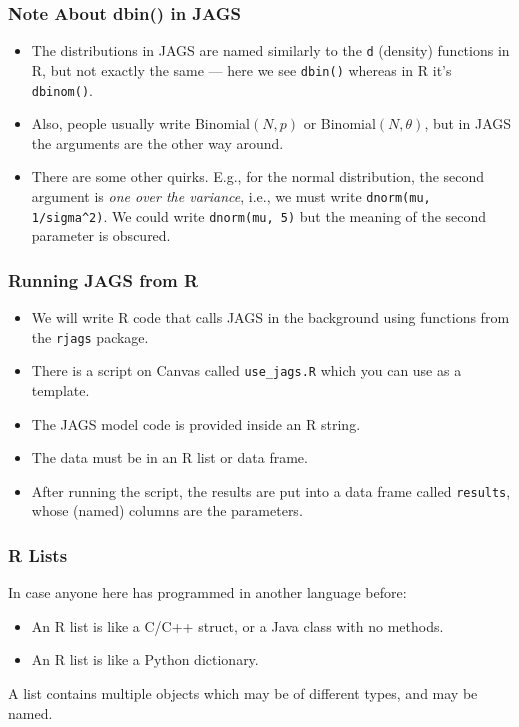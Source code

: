 \documentclass{beamer}
\begin{document}
\begin{frame}[fragile]
\frametitle{Note About dbin() in JAGS}

\begin{itemize}
\item The distributions in JAGS are named similarly to the \texttt{d}
(density) functions in R, but not exactly the same --- here we see
\texttt{dbin()} whereas in R it's \texttt{dbinom()}.\pause
\item Also, people usually write Binomial$(N, p)$ or Binomial$(N, \theta)$,
but in JAGS the arguments are the other way around.\pause
\item There are some other quirks. E.g., for the normal distribution, the
second argument is {\em one over the variance}, i.e., we must write
\texttt{dnorm(mu, 1/sigma^2)}. 
We could write \texttt{dnorm(mu, 5)}
but the meaning of the second parameter is obscured.
\end{itemize}

\end{frame}



\begin{frame}[fragile]
\frametitle{Running JAGS from R}

\begin{itemize}
\item We will write R code that calls JAGS in the background using functions
from the \texttt{rjags} package.\pause
\item There is a script on Canvas called \texttt{use\_jags.R} which you can
use as a template.\pause
\item The JAGS model code is provided inside an R string.\pause
\item The data must be in an R list or data frame.\pause
\item After running the script, the results are put into a data frame called
\texttt{results}, whose (named) columns are the parameters.
\end{itemize}

\end{frame}

\begin{frame}
\frametitle{R Lists}
In case anyone here has programmed in another
language before:
\begin{itemize}
\item An R list is like a C/C++ struct, or a Java class with no methods.\pause
\item An R list is like a Python dictionary.
\end{itemize}

\pause
A list contains multiple objects which may be of different types, and may be
named.
\end{frame}
\end{document}
